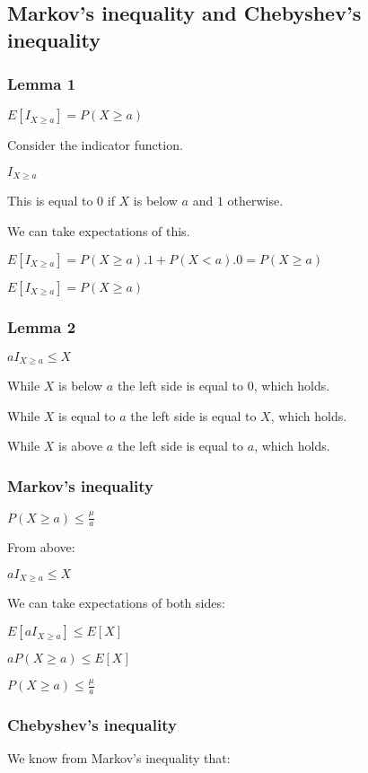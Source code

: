 
\subsection{Markov's inequality and Chebyshev's inequality}
\subsubsection{Lemma 1}

$E[I_{X\ge a}]=P(X\ge a)$

Consider the indicator function.

$I_{X\ge a}$

This is equal to \(0\) if \(X\) is below \(a\) and \(1\) otherwise.

We can take expectations of this.

$E[I_{X\ge a}]=P(X\ge a).1+P(X<a).0=P(X\ge a)$

$E[I_{X\ge a}]=P(X\ge a)$

\subsubsection{Lemma 2}

$aI_{X\ge a}\le X$

While \(X\) is below \(a\) the left side is equal to \(0\), which holds.

While \(X\) is equal to \(a\) the left side is equal to \(X\), which holds.

While \(X\) is above \(a\) the left side is equal to \(a\), which holds.

\subsubsection{Markov’s inequality}

$P(X\ge a)\le \frac{\mu  }{a}$

From above:

$aI_{X\ge a}\le X$

We can take expectations of both sides:

$E[aI_{X\ge a}]\le E[X]$

$aP(X\ge a)\le E[X]$

$P(X\ge a)\le \frac{\mu  }{a}$

\subsubsection{Chebyshev’s inequality}

We know from Markov’s inequality that:

